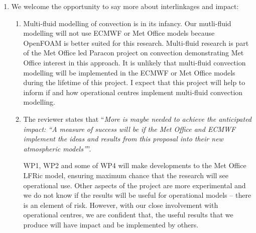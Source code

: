 \begin{enumerate}
\item \label{it:interlinkages} We welcome the opportunity to say more about interlinkages and impact:
    \begin{enumerate}
    \item Multi-fluid modelling of convection is in its infancy. Our mutli-fluid modelling  will not use ECMWF or Met Office models because OpenFOAM is better suited for this research. Multi-fluid research is part of the Met Office led Paracon project on convection demonstrating Met Office interest in this approach. It is unlikely that multi-fluid convection modelling will be implemented in the ECMWF or Met Office models during the lifetime of this project. I expect that this project will help to inform if and how operational centres implement multi-fluid convection modelling.
    
    \item The reviewer states that ``{\it More is maybe needed to achieve the anticipated impact: ``A measure of success will be if the Met Office and ECMWF implement the ideas and results from this proposal into their new atmospheric models''}''.
    
    WP1, WP2 and some of WP4 will make developments to the Met Office LFRic model, ensuring maximum chance that the research will see operational use. Other aspects of the project are more experimental and we do not know if the results will be useful for operational models -- there is an element of risk. However, with our close involvement with operational centres, we are confident that, the useful results that we produce will have impact and be implemented by others.
    \end{enumerate}

\end{enumerate}

